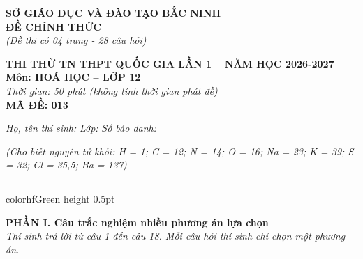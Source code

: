 \documentclass[11pt,a4paper]{article}
\begin{document}
\begin{minipage}[t]{0.48\textwidth}
\textbf{SỞ GIÁO DỤC VÀ ĐÀO TẠO BẮC NINH}\\
\textbf{ĐỀ CHÍNH THỨC}\\
\textit{(Đề thi có 04 trang - 28 câu hỏi)}
\end{minipage}
\hfill
\begin{minipage}[t]{0.48\textwidth}
\raggedleft
\textbf{\color{hfRed}THI THỬ TN THPT QUỐC GIA LẦN 1 -- NĂM HỌC 2026-2027}\\
\textbf{Môn: HOÁ HỌC -- LỚP 12}\\
\textit{Thời gian: 50 phút (không tính thời gian phát đề)}\\
\textbf{MÃ ĐỀ: 013}
\end{minipage}

\vspace{4pt}
\noindent
\textit{Họ, tên thí sinh:} \dotfill \textit{Lớp:} \dotfill \textit{Số báo danh:} \dotfill

\vspace{3pt}
\noindent
\textit{\footnotesize (Cho biết nguyên tử khối: H = 1; C = 12; N = 14; O = 16; Na = 23; K = 39; S = 32; Cl = 35,5; Ba = 137)}

\vspace{3pt}
\hrule color{hfGreen} height 0.5pt

\vspace{4pt}
\noindent
{\color{mainGreen}\textbf{\large PHẦN I. Câu trắc nghiệm nhiều phương án lựa chọn}}\\
\textit{\small Thí sinh trả lời từ câu 1 đến câu 18. Mỗi câu hỏi thí sinh chỉ chọn một phương án.}
\vspace{2pt}
\end{document}

